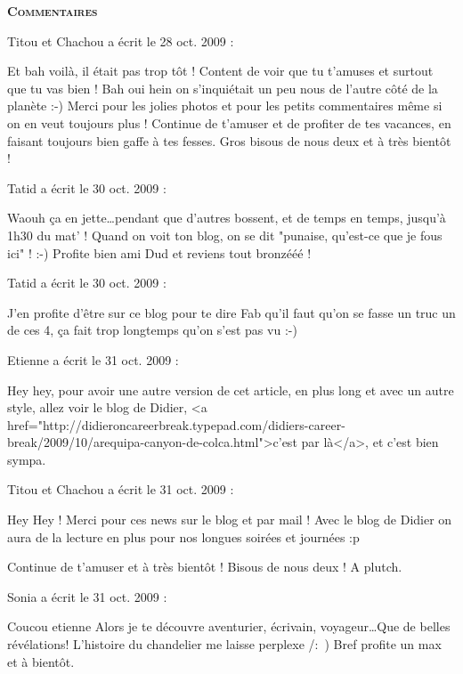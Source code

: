 \bigskip
\textbf{\textsc{Commentaires}}

\medskip
Titou et Chachou a écrit le 28 oct. 2009 :
\begin{displayquote}
Et bah voilà, il était pas trop tôt ! Content de voir que tu t'amuses et surtout que tu vas bien ! Bah oui hein on s'inquiétait un peu nous de l'autre côté de la planète :-)
Merci pour les jolies photos et pour les petits commentaires même si on en veut toujours plus !
Continue de t'amuser et de profiter de tes vacances, en faisant toujours bien gaffe à tes fesses.
Gros bisous de nous deux et à très bientôt !
\end{displayquote}

\medskip
Tatid a écrit le 30 oct. 2009 :
\begin{displayquote}
Waouh ça en jette\dots pendant que d'autres bossent, et de temps en temps, jusqu'à 1h30 du mat' ! Quand on voit ton blog, on se dit "punaise, qu'est-ce que je fous ici" ! :-)
Profite bien ami Dud et reviens tout bronzééé !
\end{displayquote}

\medskip
Tatid a écrit le 30 oct. 2009 :
\begin{displayquote}
J'en profite d'être sur ce blog pour te dire Fab qu'il faut qu'on se fasse un truc un de ces 4, ça fait trop longtemps qu'on s'est pas vu :-)
\end{displayquote}

\medskip
Etienne a écrit le 31 oct. 2009 :
\begin{displayquote}
Hey hey, pour avoir une autre version de cet article, en plus long et avec un autre style, allez voir le blog de Didier, <a href="http://didieroncareerbreak.typepad.com/didiers-career-break/2009/10/arequipa-canyon-de-colca.html">c'est par là</a>, et c'est bien sympa.
\end{displayquote}

\medskip
Titou et Chachou a écrit le 31 oct. 2009 :
\begin{displayquote}
Hey Hey ! Merci pour ces news sur le blog et par mail ! Avec le blog de Didier on aura de la lecture en plus pour nos longues soirées et journées :p

Continue de t'amuser et à très bientôt !
Bisous de nous deux !
A plutch.
\end{displayquote}

\medskip
Sonia a écrit le 31 oct. 2009 :
\begin{displayquote}
Coucou etienne
Alors je te découvre aventurier, écrivain, voyageur\dots Que de belles révélations!
L'histoire du chandelier me laisse perplexe /:~)
Bref profite un max et à bientôt.
\end{displayquote}

